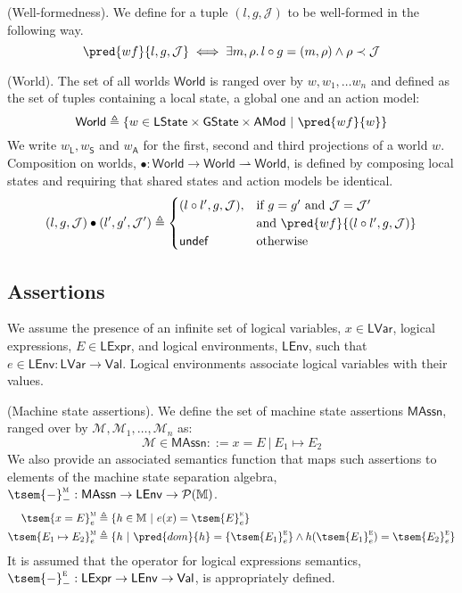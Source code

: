  (Well-formedness). We define for a tuple $(l, g, \mathcal{J})$ to be well-formed in the following way.
\[
	\pred{wf}{l, g, \mathcal{J}} \iff \exists m, \rho \ldotp l \circ g = (m, \rho) \land \rho \prec \mathcal{J}
\]

 (World). The set of all worlds $\mathsf{World}$ is ranged over by $w, w_1, \ldots w_n$ and defined as the set of tuples containing a local state, a global one and an action model:
\[
	\mathsf{World} \triangleq \{ w \in \mathsf{LState} \times \mathsf{GState} \times \mathsf{AMod}\ |\ \pred{wf}{w} \}
\]
We write $w_\mathsf{L}, w_\mathsf{S}$ and $w_\mathsf{A}$ for the first, second and third projections of a world $w$. Composition on worlds, $\bullet : \mathsf{World} \rightarrow \mathsf{World} \rightharpoonup \mathsf{World}$, is defined by composing local states and requiring that shared states and action models be identical.
\[
	(l, g, \mathcal{J}) \bullet (l', g', \mathcal{J}') \triangleq
	\begin{cases}
		(l \circ l', g, \mathcal{J}), & \text{if } g = g' \text{ and } \mathcal{J} = \mathcal{J}' \\ & \text{and } \pred{wf}{(l \circ l', g, \mathcal{J})}
		\\
		\mathsf{undef} & \text{otherwise}
	\end{cases}
\]

\subsection{Assertions}

We assume the presence of an infinite set of logical variables, $x \in \mathsf{LVar}$, logical expressions, $E \in \mathsf{LExpr}$, and logical environments, $\mathsf{LEnv}$, such that $e \in \mathsf{LEnv} : \mathsf{LVar} \rightarrow \mathsf{Val}$. Logical environments associate logical variables with their values.

\param (Machine state assertions). We define the set of machine state assertions $\mathsf{MAssn}$, ranged over by $\mathcal{M}, \mathcal{M}_1, \ldots, \mathcal{M}_n$ as:
\[
	\mathcal{M} \in \mathsf{MAssn} ::= x = E\ |\ E_1 \mapsto E_2
\]
We also provide an associated semantics function that maps such assertions to elements of the machine state separation algebra, $\tsem{-}_-^\textsc{m} : \mathsf{MAssn} \rightarrow \mathsf{LEnv} \rightarrow \mathcal{P}(\mathbb{M})$.
\begin{align*}
	\tsem{x = E}^\textsc{m}_e &\triangleq \{ h \in \mathbb{M}\ |\ e(x) = \tsem{E}^\textsc{e}_e \}
	\\
	\tsem{E_1 \mapsto E_2}_e^\textsc{m} &\triangleq \{ h\ |\ \pred{dom}{h} = \{\tsem{E_1}_e^\textsc{e}\} \land h(\tsem{E_1}_e^\textsc{e}) = \tsem{E_2}_e^\textsc{e} \}
\end{align*}
It is assumed that the operator for logical expressions semantics, $\tsem{-}_-^\textsc{e} : \mathsf{LExpr} \rightarrow \mathsf{LEnv} \rightarrow \mathsf{Val}$, is appropriately defined.

